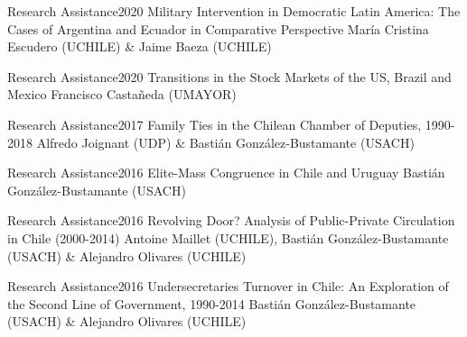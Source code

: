 





\begin{projects}
	\project
	{Research Assistance}{2020}
	{Military Intervention in Democratic Latin America: The Cases of Argentina and Ecuador in Comparative Perspective}
	{María Cristina Escudero (UCHILE) \& Jaime Baeza (UCHILE)}

	\project
	{Research Assistance}{2020}
	{Transitions in the Stock Markets of the US, Brazil and Mexico}
	{Francisco Castañeda (UMAYOR)}
	

	\project
	{Research Assistance}{2017}
	{Family Ties in the Chilean Chamber of Deputies, 1990-2018}
	{Alfredo Joignant (UDP) \& Bastián González-Bustamante (USACH)}

	\project
	{Research Assistance}{2016}
	{Elite-Mass Congruence in Chile and Uruguay}
	{Bastián González-Bustamante (USACH)}
	
	\project
	{Research Assistance}{2016}
	{Revolving Door? Analysis of Public-Private Circulation in Chile (2000-2014)}
	{Antoine Maillet (UCHILE), Bastián González-Bustamante (USACH) \& Alejandro Olivares (UCHILE)}

	\project
	{Research Assistance}{2016}
	{Undersecretaries Turnover in Chile: An Exploration of the Second Line of Government, 1990-2014}
	{Bastián González-Bustamante (USACH) \& Alejandro Olivares (UCHILE)}
	
\end{projects}
